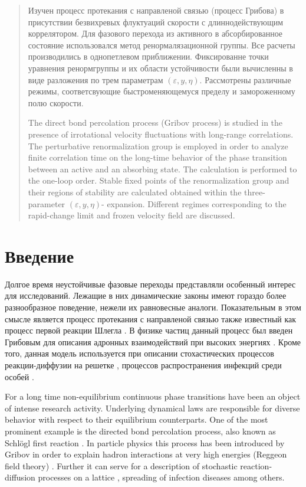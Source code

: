 \documentclass[12pt]{article}
\def\eps{\varepsilon}
\begin{document}
\begin{abstract}
Изучен процесс протекания с направленой связью (процесс Грибова) в присутствии безвихревых флуктуаций скорости с длиннодействующим коррелятором.
Для фазового перехода из активного в абсорбированное состояние использовался метод ренормалязационной группы. 
Все расчеты производились в однопетлевом приближении.
Фиксированне точки уравнения ренормгруппы и их области устойчивости были вычисленны в виде разложения по трем параметрам  $(\eps,y,\eta)$. Рассмотрены различные режимы, соответсвующие быстроменяющемуся пределу и замороженному полю скорости.

The direct bond percolation process (Gribov process) is studied in the presence of
 irrotational velocity fluctuations with long-range correlations. The perturbative renormalization group 
 is employed in order to analyze finite correlation time on the long-time behavior 
 of the phase transition between an active and an absorbing
state. The calculation is performed to the one-loop order. 
Stable fixed points of the renormalization group and their regions of stability are
calculated obtained within the three-parameter $(\eps,y,\eta)$-
expansion. Different regimes corresponding to the rapid-change limit and frozen velocity field
are discussed.
\end{abstract}
{\section{Введение} \label{sec:intro}}
Долгое время неустойчивые фазовые переходы \cite{Hin06} представляли особенный интерес для исследований.
Лежащие в них динамические законы имеют гораздо более разнообразное поведение, нежели их равновесные аналоги.
Показательным в этом смысле является процесс протекания с направленой связью \cite{Stauffer,HHL08} также известный как процесс первой реакции Шлегла .
В физике частиц данный процесс был введен Грибовым \cite{Gribov} для описания адронных взаимодействий при высоких энергиях  \cite{Cardy}. 
Кроме того, данная модель используется при описании стохастических процессов реакции-диффузии на решетке \cite{Hinrichsen}, процессов распространения инфекций среди особей \cite{Janssen81}.

For a long time non-equilibrium continuous phase transitions \cite{Hin06} have been an object
of intense research activity. Underlying dynamical laws are responsible
for diverse behavior with respect to their equilibrium counterparts.
One of the most prominent example is the directed bond 
 percolation \cite{Stauffer,HHL08} process, also known as Schl\"ogl first reaction \cite{Schlogl,Grassberger82}. 
 In particle physics this process has been introduced by Gribov \cite{Gribov} in order
 to explain hadron interactions at very high
 energies (Reggeon field theory) \cite{Cardy}. Further it can serve for a description of
 stochastic reaction-diffusion processes on a lattice \cite{Hinrichsen}, spreading 
 of infection diseases \cite{Janssen81} among others.  
 
\end{document}
